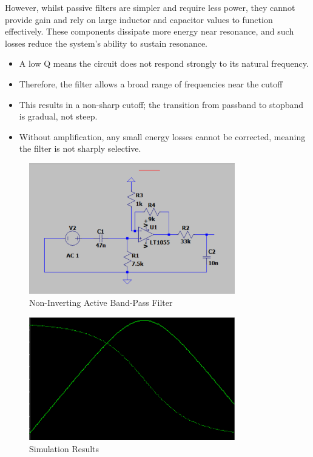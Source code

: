 However, whilst passive filters are simpler and require less power, they cannot provide gain and rely on large inductor and capacitor values to function effectively. These components dissipate more energy near resonance, and such losses reduce the system's ability to sustain resonance.
\begin{itemize}
    \item A low Q means the circuit does not respond strongly to its natural frequency.
    \item Therefore, the filter allows a broad range of frequencies near the cutoff
    \item This results in a non-sharp cutoff; the transition from passband to stopband is gradual, not steep.
    \item Without amplification, any small energy losses cannot be corrected, meaning the filter is not sharply selective.
\end{itemize}

\begin{figure}[h]
    \centering
    \includegraphics[width=0.8\textwidth]{subpages/images/non-invert-active-bp-filter.png}
    \caption{Non-Inverting Active Band-Pass Filter}
    \label{fig:active_bp_filter}
\end{figure}
\begin{figure}[h]
    \centering
    \includegraphics[width=0.8\textwidth]{subpages/images/ir_result_1.png}
    \caption{Simulation Results}
    \label{fig:simul_result}
\end{figure}

